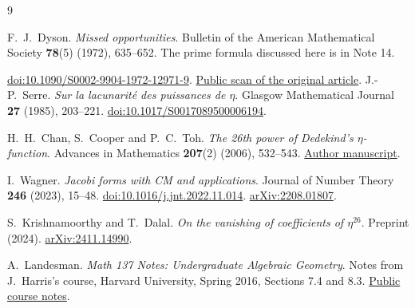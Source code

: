 \documentclass[a4paper,11pt]{article}
\theoremstyle{definition}
\begin{document}
\begingroup
\small
\linespread{1.02}\selectfont
\begin{thebibliography}{9}
\setlength{\itemsep}{.35em}
\setlength{\parskip}{0pt}
\raggedright
{}
F.~J.~Dyson.
\textit{Missed opportunities}.
Bulletin of the American Mathematical Society \textbf{78}(5) (1972),
635--652. The prime formula discussed here is in Note 14.

\href{https://doi.org/10.1090/S0002-9904-1972-12971-9}{doi:10.1090/S0002-9904-1972-12971-9}.
\href{https://wucj.lab.westlake.edu.cn/Others/Dyson_missedopportunity.pdf}{Public scan of the original article}.
J.-P.~Serre.
\textit{Sur la lacunarité des puissances de \(\eta\)}.
Glasgow Mathematical Journal \textbf{27} (1985), 203--221.
\href{https://doi.org/10.1017/S0017089500006194}{doi:10.1017/S0017089500006194}.

H.~H.~Chan, S.~Cooper and P.~C.~Toh.
\textit{The 26th power of Dedekind's \(\eta\)-function}.
Advances in Mathematics \textbf{207}(2) (2006), 532--543.
\href{https://math.nie.edu.sg/pctoh/archive/26thpowerofeta.pdf}{Author manuscript}.

I.~Wagner.
\textit{Jacobi forms with CM and applications}.
Journal of Number Theory \textbf{246} (2023), 15--48.
\href{https://doi.org/10.1016/j.jnt.2022.11.014}{doi:10.1016/j.jnt.2022.11.014}.
\href{https://arxiv.org/abs/2208.01807}{arXiv:2208.01807}.

S.~Krishnamoorthy and T.~Dalal.
\textit{On the vanishing of coefficients of \(\eta^{26}\)}.
Preprint (2024).
\href{https://arxiv.org/abs/2411.14990}{arXiv:2411.14990}.


A.~Landesman.
\textit{Math 137 Notes: Undergraduate Algebraic Geometry}.
Notes from J.~Harris's course, Harvard University, Spring 2016,
Sections 7.4 and 8.3.
\href{https://people.math.harvard.edu/~landesman/assets/harris-undergrad-algebraic-geometry-notes.pdf}
{Public course notes}.
\end{thebibliography}
\endgroup
\end{document}
